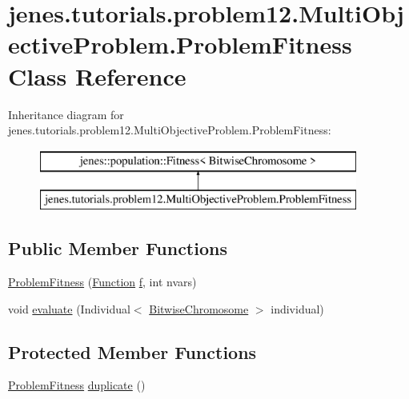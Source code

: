 \hypertarget{classjenes_1_1tutorials_1_1problem12_1_1_multi_objective_problem_1_1_problem_fitness}{\section{jenes.\-tutorials.\-problem12.\-Multi\-Objective\-Problem.\-Problem\-Fitness Class Reference}
\label{classjenes_1_1tutorials_1_1problem12_1_1_multi_objective_problem_1_1_problem_fitness}
}
Inheritance diagram for jenes.\-tutorials.\-problem12.\-Multi\-Objective\-Problem.\-Problem\-Fitness\-:\begin{figure}[H]
\begin{center}
\leavevmode
\includegraphics[height=2.000000cm]{classjenes_1_1tutorials_1_1problem12_1_1_multi_objective_problem_1_1_problem_fitness}
\end{center}
\end{figure}
\subsection*{Public Member Functions}
\begin{DoxyCompactItemize}
\item 
\hyperlink{classjenes_1_1tutorials_1_1problem12_1_1_multi_objective_problem_1_1_problem_fitness_a068552989c9e8129de22f836c6eca975}{Problem\-Fitness} (\hyperlink{classjenes_1_1tutorials_1_1problem12_1_1_multi_objective_problem_1_1_function}{Function} \hyperlink{classjenes_1_1tutorials_1_1problem12_1_1_multi_objective_problem_1_1_problem_fitness_ad8bff7799f57db81574946eb94ea9a90}{f}, int nvars)
\item 
void \hyperlink{classjenes_1_1tutorials_1_1problem12_1_1_multi_objective_problem_1_1_problem_fitness_ac44148dc48a9c5389dd4494f86b45580}{evaluate} (Individual$<$ \hyperlink{classjenes_1_1chromosome_1_1_bitwise_chromosome}{Bitwise\-Chromosome} $>$ individual)
\end{DoxyCompactItemize}
\subsection*{Protected Member Functions}
\begin{DoxyCompactItemize}
\item 
\hyperlink{classjenes_1_1tutorials_1_1problem12_1_1_multi_objective_problem_1_1_problem_fitness}{Problem\-Fitness} \hyperlink{classjenes_1_1tutorials_1_1problem12_1_1_multi_objective_problem_1_1_problem_fitness_aa6d59fefc5d3beec2f4808adeeee225b}{duplicate} ()
\end{DoxyCompactItemize}
